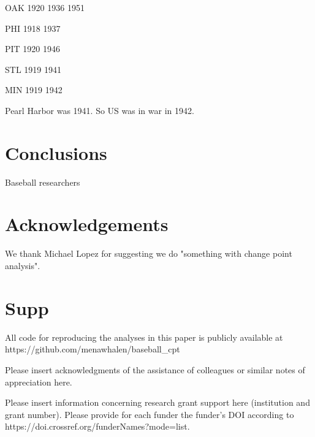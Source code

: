 \documentclass[USenglish]{article}
\theoremstyle{dgthm}
\theoremstyle{dgdef}
\begin{document}
OAK 1920 1936 1951

PHI 1918 1937

PIT 1920 1946

STL 1919 1941

MIN 1919 1942

Pearl Harbor was 1941.  So US was in war in 1942.  

\section{Conclusions}
Baseball researchers 


\section{Acknowledgements}
We thank Michael Lopez for suggesting we do "something with change point analysis".  

\section{Supp}

All code for reproducing the analyses in this paper is publicly available at https://github.com/menawhalen/baseball\_cpt


\begin{acknowledgement}
  Please insert acknowledgments of the assistance of colleagues or similar notes of appreciation here.
\end{acknowledgement}

\begin{funding}
  Please insert information concerning research grant support here (institution and grant number). Please provide for each funder the funder’s DOI according to https://doi.crossref.org/funderNames?mode=list.
\end{funding}



\end{document}
